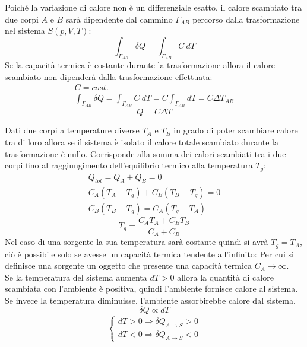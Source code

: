 \documentclass{article}
\numberwithin{equation}{subsection}
\begin{document}
Poiché la variazione di calore non è un 
differenziale esatto, il calore scambiato tra due corpi $A$ e $B$ 
sarà 
dipendente dal cammino $\Gamma_{AB}$ percorso dalla trasformazione nel 
sistema $S(p,V,T)$:
\begin{equation}
    \displaystyle\int_{\Gamma_{AB}}\delta Q =\int_{\Gamma_{AB}}C\:dT
\end{equation}
Se la capacità termica è costante durante la trasformazione 
allora il calore scambiato non dipenderà dalla trasformazione 
effettuata:
\begin{gather*}
    C=cost.\\
    \displaystyle\int_{\Gamma_{AB}}\delta Q =\int_{\Gamma_{AB}}C\:dT=C\int_{\Gamma_{AB}}dT=C\Delta T_{AB}
\end{gather*}
\begin{equation}
    Q=C\Delta T
\end{equation}

Dati due corpi a temperature diverse $T_A$ e $T_B$ in grado di poter scambiare calore tra di loro allora
se il sistema è isolato il calore totale scambiato 
durante la trasformazione è nullo. Corrisponde alla  
somma dei calori scambiati tra i due corpi fino al raggiungimento dell'equilibrio termico alla temperatura $T_g$:
\begin{gather*}
    Q_{tot}=Q_A+Q_B=0\\
    C_A(T_A-T_g)+C_B(T_B-T_g)=0\\
    C_B(T_B-T_g)=C_A(T_g-T_A)
\end{gather*}
\begin{equation}
    T_g=\displaystyle\frac{C_AT_A+C_BT_B}{C_A+C_B}
\end{equation}
Nel caso di una sorgente la sua temperatura sarà costante 
quindi si avrà $T_g=T_A$, ciò è possibile solo se avesse 
un capacità termica tendente all'infinito: Per cui si definisce 
una sorgente un oggetto che presente una capacità termica $C_A\to\infty$. 
\\
Se la temperatura del sistema aumenta $dT>0$ allora la 
quantità di calore scambiata con l'ambiente è positiva, 
quindi l'ambiente fornisce calore al sistema. Se invece la 
temperatura diminuisse, l'ambiente assorbirebbe calore dal 
sistema.
\begin{equation*}
    \delta Q\propto dT
\end{equation*}
\begin{gather}
    \begin{cases}
        dT>0\Rightarrow\delta Q_{A\to S}>0\\
        dT<0\Rightarrow\delta Q_{A\to S}<0
    \end{cases}
\end{gather}
\end{document}
